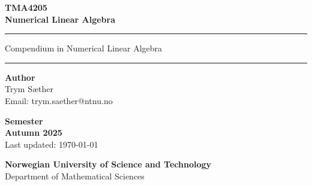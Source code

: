 \begin{titlepage}
    \newcommand{\HRule}{\rule{\linewidth}{1pt}}
    \centering

    \vfill

    {\color{ntnu-blue}\sffamily\bfseries\LARGE TMA4205}\\[0.3cm]
    {\sffamily\bfseries\fontsize{28}{32}\selectfont Numerical Linear Algebra}\\[0.5cm]

    \vfill

    {\color{ntnu-lightblue}\HRule}

    \vspace{0.5cm}

    {\color{ntnu-blue}\sffamily\Large Compendium in Numerical Linear Algebra}\\[0.5cm]

    \vspace{0.5cm}

    {\color{ntnu-lightblue}\HRule}

    \vfill

    \begin{minipage}[tb]{0.45\textwidth}
        \raggedright
        {\color{ntnu-blue}\sffamily\large\textbf{Author}}\\[0.2cm]
        {\sffamily\large Trym Sæther}\\[0.2cm]

        {\sffamily\large Email: trym.saether@ntnu.no}\\[0.2cm]
    \end{minipage}
    \hfill
    \begin{minipage}[tb]{0.45\textwidth}
        \raggedleft
        {\color{ntnu-blue}\sffamily\large\textbf{Semester}}\\[0.2cm]
        {\bfseries\sffamily\large Autumn 2025}\\[0.2cm]
        {\sffamily\large Last updated: \today}
    \end{minipage}

    \vspace{1cm}
    {\color{ntnu-blue}\sffamily\bfseries\Large Norwegian University of Science and Technology}\\[0.2cm]
    {\sffamily\large Department of Mathematical Sciences}
\end{titlepage}
